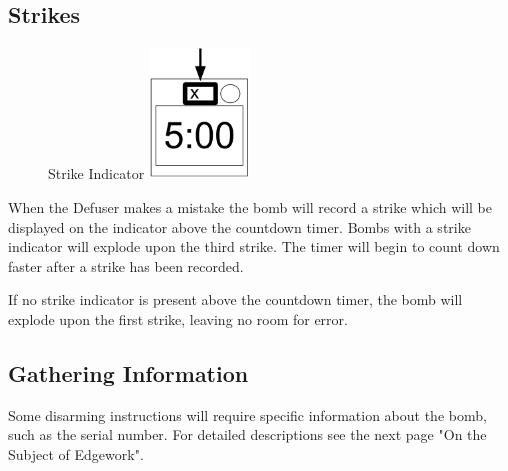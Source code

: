 \subsection*{Strikes}
\begin{figure} %
  \vspace{-2\baselineskip}
  Strike Indicator
  \centering
  \includegraphics[height=3.5cm]{modules/0_explanation/strike}
  \label{fig:Strikes}
\end{figure}
When the Defuser makes a mistake the bomb will record a strike
which will be displayed on the indicator above the countdown
timer. Bombs with a strike indicator will explode upon the
third strike. The timer will begin to count down faster after
a strike has been recorded.

If no strike indicator is present above the countdown timer,
the bomb will explode upon the first strike, leaving no room
for error.

\subsection*{Gathering Information}
Some disarming instructions will require specific information about the
bomb, such as the serial number. For detailed descriptions see the next
page "On the Subject of Edgework".

\clearpage
